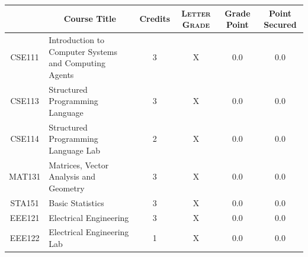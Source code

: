 \documentclass[11pt]{article}
\newcommand*{\numtwo}[1]{\pgfmathprintnumber[
                    fixed, precision=2, fixed zerofill=true]{#1}}
\begin{document}
                \begin{center}
                    \renewcommand{\arraystretch}{1.08}
                    
                \begin{tabular}{|c|l|c|>{\scshape}c|c|c|}
                \hline  \rule[-1ex]{0pt}{3.5ex} {\centering{\bf Course Code}} &  \multicolumn{1}{c|}{\textbf{Course Title}}  & {\bf Credits} & {\bf Letter Grade} & {\bf Grade Point} & {\bf Point Secured}  \\ 
                \hline   CSE111 &  Introduction to Computer Systems and Computing Agents		 & 3 & X & 0.0 & 0.0 \\ %
                \hline   CSE113 &  Structured Programming Language		 & 3 & X & 0.0 & 0.0 \\ %
                \hline   CSE114 &  Structured Programming Language Lab		 & 2 & X & 0.0 & 0.0 \\ %
                \hline   MAT131 &  Matrices, Vector Analysis and Geometry		 & 3 & X & 0.0 & 0.0 \\ %
                \hline   STA151 &  Basic Statistics		 & 3 & X & 0.0 & 0.0 \\ %
                \hline   EEE121 &  Electrical Engineering		 & 3 & X & 0.0 & 0.0 \\ %
                \hline   EEE122 &  Electrical Engineering Lab		 & 1 & X & 0.0 & 0.0 \\ %

\hline                %
                \end{tabular}
                \end{center}
                \renewcommand{\arraystretch}{1.03}
\end{document}
